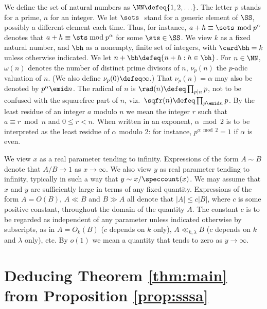 \documentclass[12pt, reqno, twoside, letterpaper]{amsart}
\begin{document}
We define the set of natural numbers as 
$\NN \defeq \{1,2,\ldots\}$.
%
The letter $p$ stands for a prime, $n$ for an integer.
%
We let $\sots\ $ stand for a generic element of $\SS$, possibly a 
different element each time.
%
Thus, for instance, $a + h\equiv \sots \, \bmod p^{\alpha}$ denotes 
that $a + h \equiv \sts \bmod p^{\alpha}$ for some $\sts \in \SS$.
%
We view $k$ as a fixed natural number, and $\bh$ as a nonempty, 
finite set of integers, with $\card \bh = k$ unless otherwise 
indicated.
%
We let $n + \bh \defeq \{n + h : h \in \bh\}$.
%
For $n \in \NN$, $\omega(n)$ denotes the number of distinct prime 
divisors of $n$, $\nu_p(n)$ the $p$-adic valuation of $n$.
%
(We also define $\nu_p(0) \defeq \infty$.) 
%
That $\nu_p(n) = \alpha$ may also be denoted by 
$p^{\alpha} \emid n$.
%
The radical of $n$ is $\rad(n) \defeq \prod_{p \mid n} p$, not to 
be confused with the squarefree part of $n$, viz.\  
$\sqfr(n) \defeq \prod_{p \emid n} p$.
%
By the least residue of an integer $a$ modulo $n$ we mean the 
integer $r$ such that $a \equiv r \bmod n$ and $0 \le r < n$.
%
When written in an exponent, $\alpha \bmod 2$ is to be interpreted 
as the least residue of $\alpha$ modulo $2$: for instance, 
$p^{\alpha \bmod 2} = 1$ if $\alpha$ is even.

We view $x$ as a real parameter tending to infinity.
%
Expressions of the form $A \sim B$ denote that $A/B \to 1$ as 
$x \to \infty$.
%
We also view $y$ as real parameter tending to infinity, 
typically in such a way that $y \sim x/\speccount(x)$.
%
We may assume that $x$ and $y$ are sufficiently large in terms of 
any fixed quantity.
%
%
Expressions of the form $A = O(B)$, $A \ll B$ and $B \gg A$ all 
denote that $|A| \le c|B|$, where $c$ is some positive constant, 
throughout the domain of the quantity $A$.
%
The constant $c$ is to be regarded as independent of any parameter 
unless indicated otherwise by subscripts, as in 
$A = O_{k}(B)$ ($c$ depends on $k$ only), $A \ll_{k,\lambda} B$ 
($c$ depends on $k$ and $\lambda$ only), etc.
%
By $o(1)$ we mean a quantity that tends to zero as $y \to \infty$.


\section{Deducing Theorem \ref{thm:main} from Proposition \ref{prop:sssa}}
 \label{sec:main}
\end{document}
